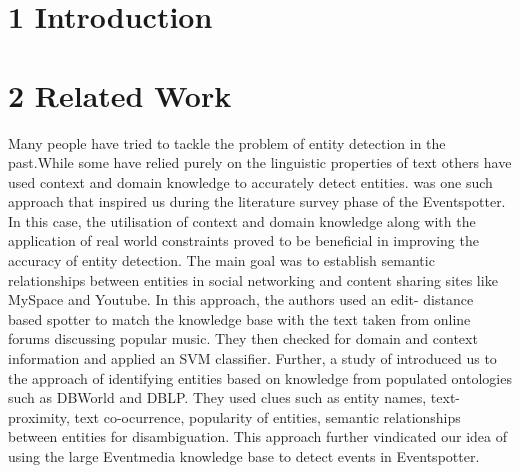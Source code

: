 \documentclass[a4paper,11pt]{report}
\begin{document}
\chapter*{1 Introduction}


\chapter*{2 Related Work}
Many people have tried to tackle the problem of entity detection in the past.While some have relied purely on the linguistic properties of text others have used context and domain knowledge to accurately detect entities. \cite{Gruhl_contextand} was one such approach that inspired us during the literature survey phase of the Eventspotter. In this case, the utilisation of context and domain knowledge along with the application of real world constraints proved to be beneficial in improving the accuracy of entity detection. The main goal was to establish semantic relationships between entities in social networking and content sharing sites like MySpace and Youtube. In this approach, the authors used an edit- distance based spotter to match the knowledge base with the text taken from online forums discussing popular music. They then checked for domain and context information and applied an SVM classifier. Further, a study of \cite{Hassell06ontology-drivenautomatic} introduced us to the approach of identifying entities based on knowledge from populated ontologies such as DBWorld and DBLP. They used clues such as entity names, text-proximity, text co-ocurrence, popularity of entities, semantic relationships between entities for disambiguation. This approach further vindicated our idea of using the large Eventmedia knowledge base to detect events in Eventspotter.\newline
\end{document}
